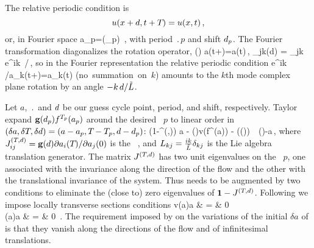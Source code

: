 



The relative periodic condition is
\[
    u(x+d,t+{T_{}})=u(x,t)
        \,,
\]
or, in Fourier space
\beq
    a_p=(\shift_p)   
\,,
    \label{eq:RPOcond}
\eeq
with period $\period{p}$ and shift $d_p$. 
The Fourier transformation diagonalizes the rotation operator, 
\beq
    (\shift)  a(t+\period{})=a(t)\,,\qquad
            _{jk}(d) = \delta_{jk} e^{ik\, \shift/\tildeL}\,,
    \label{eq:RPO}
\eeq
so in the Fourier representation the relative periodic condition
\beq
    e^{ik\, \shift /\tildeL}a_k(t+\period{})=a_k(t)  %
    \qquad \mbox{(no summation on $k$)}
    \label{eq:RPOcondition}
\eeq
amounts to the $k$th mode complex plane rotation by an 
angle $-k\, d /\tilde{L}$.

Let 
$a$, $\period{}$ and $d$ 
be our guess cycle point, period, and shift, respectively. 
Taylor expand $\mathbf{g}(d_p)  {f^{{T_{p}}}(a_p)}$ 
around the desired \rpo\ $p$ to linear order in
$(\delta a,\delta {T_{}},\delta d) 
   =(a-a_p,{T_{}} - {T_{p}},d-d_p)$:
\beq
    \left({1}-\jMps^{(\period{},\shift)}\right) \delta a 
   - (\shift)v(f^{\period{}}(a)) \delta \period{} 
                            - ((\shift))\delta \shift  
                    \,\simeq\, (\shift)-a\,,
    \label{eq:NewtonBasicCond}          
\eeq
where ${J}^{({T_{}},d)}_{ij} 
  = \mathbf{g}(d)\partial a_i({T_{}})/\partial a_j(0)$
is the \rpo\ {\jacobianM}, and
$L_{kj}=\frac{ik}{\tilde{L}}\delta_{kj}$ is the Lie algebra translation
generator. 
The matrix ${J}^{({T_{}},d)}$ 
has two unit eigenvalues on the \rpo\ $p$, 
one associated with the invariance along 
the direction of the flow and the other with the
translational invariance of the system. Thus  
needs to be augmented by two conditions to
eliminate the (close to) zero eigenvalues of 
$\mathbf{1}-{J}^{({T_{}},d)}$. Following 
 we impose locally transverse sections 
conditions 
\bea
    v(a)\cdot\delta a & = & 0 \label{eq:NewtonAux1} \,\\
    (a)\cdot \delta a & = & 0 
\,.
\label{eq:NewtonAux2}
\eea
The requirement imposed by 
on the variations of the initial $\delta a$ of  
is that they   vanish along the directions of the flow 
and of infinitesimal translations.


